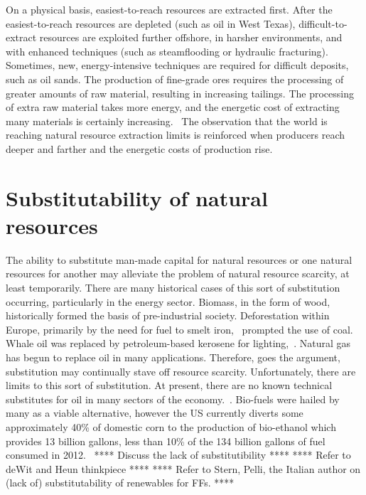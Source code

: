 On a physical basis, 
easiest-to-reach resources are extracted first. 
After the easiest-to-reach resources are depleted (such as oil in West Texas),
difficult-to-extract resources are exploited
further offshore,
in harsher environments, and
with enhanced techniques (such as steamflooding or hydraulic fracturing).
Sometimes, new, energy-intensive techniques are required 
for difficult deposits, such as oil sands.
The production of fine-grade ores
requires the processing of greater amounts of raw material, 
resulting in increasing tailings.
The processing of extra raw material takes more energy, and 
the energetic cost of extracting many materials is certainly increasing.~\cite{Mudd2010}
The observation that the world is reaching natural resource extraction limits is reinforced
when producers reach deeper and farther and the energetic costs of production rise.



\section{Substitutability of natural resources}

The ability to substitute man-made capital for natural resources
or one natural resources for another 
may alleviate the problem of natural resource scarcity,
at least temporarily.
There are many historical cases of this sort of substitution occurring,
particularly in the energy sector.
Biomass, in the form of wood,
historically formed the basis of pre-industrial society.
Deforestation within Europe,
primarily by the need for fuel to smelt iron,~\cite{Smil1994}
prompted the use of coal.
Whale oil was replaced by petroleum-based kerosene for lighting,~\cite{Weissenbacher2009}.
Natural gas has begun to replace oil in many applications.
Therefore, goes the argument, 
substitution may continually stave off resource scarcity.
Unfortunately, there are limits to this sort of substitution.
At present,
there are no known technical substitutes for oil 
in many sectors of the economy.~\cite{Hirsch2005}.
Bio-fuels were hailed by many as a viable alternative,
however the US currently diverts some  approximately 40\%
of domestic corn to the production of bio-ethanol which
provides 13 billion gallons,
less than 10\% of the 134 billion gallons of fuel 
consumed in 2012.~\cite{EIA2014, USDA2014}
**** Discuss the lack of substitutibility **** 
**** Refer to deWit and Heun thinkpiece ****
**** Refer to Stern, Pelli, the Italian author on (lack of) 
substitutability of renewables for FFs. ****

